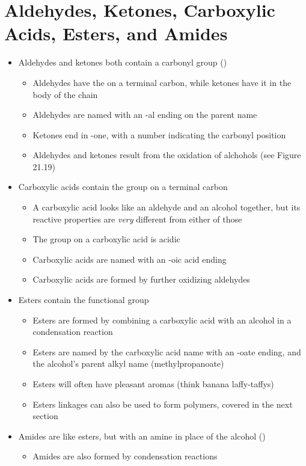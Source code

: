 \documentclass[12pt, openany, letterpaper]{memoir}
\begin{document}
\section{Aldehydes, Ketones, Carboxylic Acids, Esters, and Amides}
\begin{itemize}
	\item Aldehydes and ketones both contain a carbonyl group ()
	\begin{itemize}
		\item Aldehydes have the  on a terminal carbon, while ketones have it in the body of the chain
		\item Aldehydes are named with an -al ending on the parent name
		\item Ketones end in -one, with a number indicating the carbonyl position
		\item Aldehydes and ketones result from the oxidation of alchohols (see Figure 21.19)
	\end{itemize}
	\item Carboxylic acids contain the  group on a terminal carbon
	\begin{itemize}
		\item A carboxylic acid looks like an aldehyde and an alcohol together, but its reactive properties are \emph{very} different from either of those
		\item The  group on a carboxylic acid is acidic
		\item Carboxylic acids are named with an -oic acid ending
		\item Carboxylic acids are formed by further oxidizing aldehydes
	\end{itemize}
	\item Esters contain the  functional group
	\begin{itemize}
		\item Esters are formed by combining a carboxylic acid with an alcohol in a condensation reaction
		
		\item Esters are named by the carboxylic acid name with an -oate ending, and the alcohol's parent alkyl name (methylpropanoate)
		\item Esters will often have pleasant aromas (think banana laffy-taffys)
		\item Esters linkages can also be used to form polymers, covered in the next section
	\end{itemize}
	\item Amides are like esters, but with an amine in place of the alcohol ()
	\begin{itemize}
		\item Amides are also formed by condensation reactions
		

\end{itemize}
\end{itemize}
\end{document}
